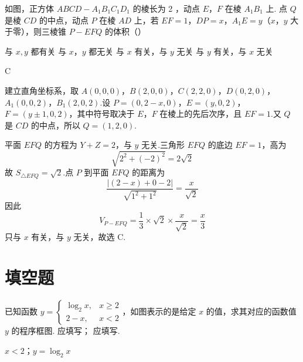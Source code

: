 \begin{problem}
如图，正方体 \(ABCD - A_{1}B_{1}C_{1}D_{1}\) 的棱长为 2 ，动点 \(E\)，\(F\) 在棱 \(A_{1}B_{1}\) 上. 点 \(Q\) 是棱 \(CD\) 的中点，动点 \(P\) 在棱 \(AD\) 上，若 \(EF = 1\)，\(DP = x\)，\(A_{1}E = y\)（\(x\)，\(y\) 大于零），则三棱锥 \(P - EFQ\) 的体积（\quad）


\choices
    {与 \(x, y\) 都有关}
    {与 \(x\)，\(y\) 都无关}
    {与 \(x\) 有关，与 \(y\) 无关}
    {与 \(y\) 有关，与 \(x\) 无关}
\end{problem}

\begin{answer}
C
\end{answer}

\begin{solution}
建立直角坐标系，取 \(A(0,0,0)\)，\(B(2,0,0)\)，\(C(2,2,0)\)，\(D(0,2,0)\)，\(A_1(0,0,2)\)，\(B_1(2,0,2)\).设 \(P=(0,2-x,0)\)，\(E=(y,0,2)\)，\(F=(y\pm1,0,2)\)，其中符号取决于 \(E\)，\(F\) 在棱上的先后次序，且 \(EF=1\).又 \(Q\) 是 \(CD\) 的中点，所以 \(Q=(1,2,0)\).

平面 \(EFQ\) 的方程为 \(Y+Z=2\)，与 \(y\) 无关.三角形 \(EFQ\) 的底边 \(EF=1\)，高为
\[
\sqrt{2^2+(-2)^2}=2\sqrt{2}
\]
故 \(S_{\triangle EFQ}=\sqrt{2}\).点 \(P\) 到平面 \(EFQ\) 的距离为
\[
\frac{|(2-x)+0-2|}{\sqrt{1^2+1^2}}=\frac{x}{\sqrt{2}}
\]
因此
\[
V_{P-EFQ}=\frac{1}{3}\times\sqrt{2}\times\frac{x}{\sqrt{2}}=\frac{x}{3}
\]
只与 \(x\) 有关，与 \(y\) 无关，故选 C.
\end{solution}

\section{填空题}

\begin{problem}
已知函数 \( y = \begin{cases}
\log_{2} x, & x \geqslant 2\\
2 - x, & x < 2
\end{cases} \)，如图表示的是给定 \(x\) 的值，求其对应的函数值 \(y\) 的程序框图.  应填写\fillinblank{}； 应填写\fillinblank{}.

\end{problem}

\begin{answer}
\(x < 2\)；\(y = \log_{2}x\)
\end{answer}

